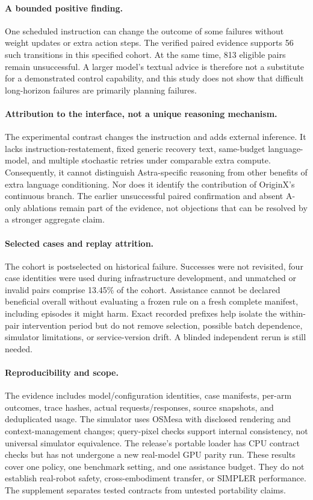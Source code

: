 \documentclass[10pt,twocolumn,letterpaper]{article}
\begin{document}
\paragraph{A bounded positive finding.}
One scheduled instruction can change the outcome of some failures without weight updates or extra action steps. The verified paired evidence supports 56 such transitions in this specified cohort. At the same time, 813 eligible pairs remain unsuccessful. A larger model's textual advice is therefore not a substitute for a demonstrated control capability, and this study does not show that difficult long-horizon failures are primarily planning failures.

\paragraph{Attribution to the interface, not a unique reasoning mechanism.}
The experimental contrast changes the instruction and adds external inference. It lacks instruction-restatement, fixed generic recovery text, same-budget language-model, and multiple stochastic retries under comparable extra compute. Consequently, it cannot distinguish Astra-specific reasoning from other benefits of extra language conditioning. Nor does it identify the contribution of OriginX's continuous branch. The earlier unsuccessful paired confirmation and absent A-only ablations remain part of the evidence, not objections that can be resolved by a stronger aggregate claim.

\paragraph{Selected cases and replay attrition.}
The cohort is postselected on historical failure. Successes were not revisited, four case identities were used during infrastructure development, and unmatched or invalid pairs comprise 13.45\% of the cohort. Assistance cannot be declared beneficial overall without evaluating a frozen rule on a fresh complete manifest, including episodes it might harm. Exact recorded prefixes help isolate the within-pair intervention period but do not remove selection, possible batch dependence, simulator limitations, or service-version drift. A blinded independent rerun is still needed.

\paragraph{Reproducibility and scope.}
The evidence includes model/configuration identities, case manifests, per-arm outcomes, trace hashes, actual requests/responses, source snapshots, and deduplicated usage. The simulator uses OSMesa with disclosed rendering and context-management changes; query-pixel checks support internal consistency, not universal simulator equivalence. The release's portable loader has CPU contract checks but has not undergone a new real-model GPU parity run. These results cover one policy, one benchmark setting, and one assistance budget. They do not establish real-robot safety, cross-embodiment transfer, or SIMPLER performance. The supplement separates tested contracts from untested portability claims.
\end{document}
